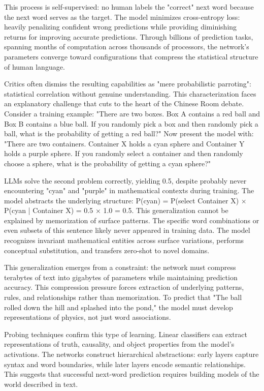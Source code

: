 This process is self-supervised: no human labels the "correct" next word because the next word serves as the target. The model minimizes cross-entropy loss: heavily penalizing confident wrong predictions while providing diminishing returns for improving accurate predictions. Through billions of prediction tasks, spanning months of computation across thousands of processors, the network's parameters converge toward configurations that compress the statistical structure of human language.

Critics often dismiss the resulting capabilities as "mere probabilistic parroting": statistical correlation without genuine understanding. This characterization faces an explanatory challenge that cuts to the heart of the Chinese Room debate. Consider a training example: "There are two boxes. Box A contains a red ball and Box B contains a blue ball. If you randomly pick a box and then randomly pick a ball, what is the probability of getting a red ball?" Now present the model with: "There are two containers. Container X holds a cyan sphere and Container Y holds a purple sphere. If you randomly select a container and then randomly choose a sphere, what is the probability of getting a cyan sphere?"

LLMs solve the second problem correctly, yielding 0.5, despite probably never encountering "cyan" and "purple" in mathematical contexts during training. The model abstracts the underlying structure: P(cyan) = P(select Container X) × P(cyan | Container X) = 0.5 × 1.0 = 0.5. This generalization cannot be explained by memorization of surface patterns. The specific word combinations or even subsets of this sentence likely never appeared in training data. The model recognizes invariant mathematical entities across surface variations, performs conceptual substitution, and transfers zero-shot to novel domains.

This generalization emerges from a constraint: the network must compress terabytes of text into gigabytes of parameters while maintaining prediction accuracy. This compression pressure forces extraction of underlying patterns, rules, and relationships rather than memorization. To predict that "The ball rolled down the hill and splashed into the pond," the model must develop representations of physics, not just word associations.

Probing techniques confirm this type of learning. Linear classifiers can extract representations of truth, causality, and object properties from the model's activations. The networks construct hierarchical abstractions: early layers capture syntax and word boundaries, while later layers encode semantic relationships. This suggests that successful next-word prediction requires building models of the world described in text.

